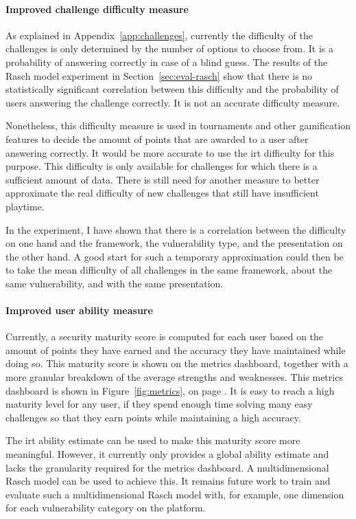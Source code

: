 \paragraph{Improved challenge difficulty measure}
As explained in Appendix~\ref{app:challenges}, currently the difficulty of the challenges is only determined by the number of options to choose from.
It is a probability of answering correctly in case of a blind guess.
The results of the Rasch model experiment in Section~\ref{sec:eval-rasch} show that there is no statistically significant correlation between this difficulty and the probability of users answering the challenge correctly.
It is not an accurate difficulty measure.

Nonetheless, this difficulty measure is used in tournaments and other gamification features to decide the amount of points that are awarded to a user after answering correctly.
It would be more accurate to use the \gls{irt} difficulty for this purpose.
This difficulty is only available for challenges for which there is a sufficient amount of data.
There is still need for another measure to better approximate the real difficulty of new challenges that still have insufficient playtime.

In the experiment, I have shown that there is a correlation between the difficulty on one hand and the framework, the vulnerability type, and the presentation on the other hand.
A good start for such a temporary approximation could then be to take the mean difficulty of all challenges in the same framework, about the same vulnerability, and with the same presentation.

\paragraph{Improved user ability measure}
Currently, a security maturity score is computed for each user based on the amount of points they have earned and the accuracy they have maintained while doing so.
This maturity score is shown on the metrics dashboard, together with a more granular breakdown of the average strengths and weaknesses.
This metrics dashboard is shown in Figure~\ref{fig:metrics}, on page \pageref{fig:metrics}.
It is easy to reach a high maturity level for any user, if they spend enough time solving many easy challenges so that they earn points while maintaining a high accuracy.

The \gls{irt} ability estimate can be used to make this maturity score more meaningful.
However, it currently only provides a global ability estimate and lacks the granularity required for the metrics dashboard.
A multidimensional Rasch model can be used to achieve this.
It remains future work to train and evaluate such a multidimensional Rasch model with, for example, one dimension for each vulnerability category on the platform.

